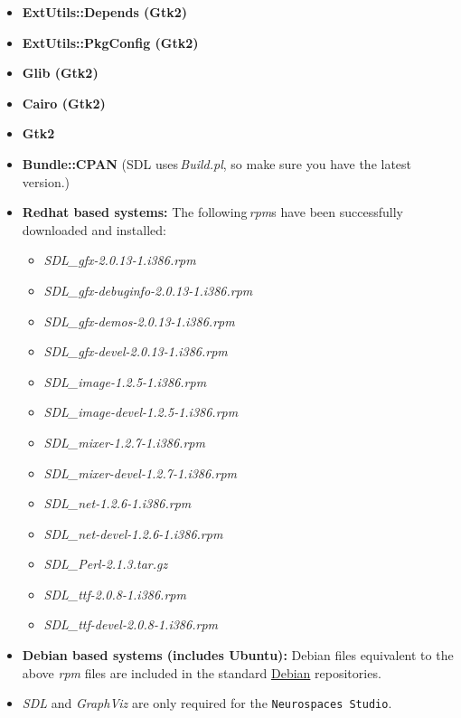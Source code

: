 \documentclass[12pt]{article}
\begin{document}
\begin{enumerate}
\begin{itemize}
\item {\bf ExtUtils::Depends (Gtk2)}
\item {\bf ExtUtils::PkgConfig (Gtk2)}
\item {\bf Glib (Gtk2)}
\item {\bf Cairo (Gtk2)}
\item {\bf Gtk2}
\end{itemize}

\begin{itemize}
\item {\bf Bundle::CPAN} (SDL uses\,{\it Build.pl}, so make sure you have the latest version.) 
\end{itemize}

\begin{itemize}
\item {\bf Redhat based systems:} The following\,{\it rpm}s have been successfully downloaded and installed:

\begin{itemize}
\item {\it SDL\_gfx-2.0.13-1.i386.rpm}
\item {\it SDL\_gfx-debuginfo-2.0.13-1.i386.rpm}
\item {\it SDL\_gfx-demos-2.0.13-1.i386.rpm}
\item {\it SDL\_gfx-devel-2.0.13-1.i386.rpm}
\item {\it SDL\_image-1.2.5-1.i386.rpm}
\item {\it SDL\_image-devel-1.2.5-1.i386.rpm}
\item {\it SDL\_mixer-1.2.7-1.i386.rpm}
\item {\it SDL\_mixer-devel-1.2.7-1.i386.rpm}
\item {\it SDL\_net-1.2.6-1.i386.rpm}
\item {\it SDL\_net-devel-1.2.6-1.i386.rpm}
\item {\it SDL\_Perl-2.1.3.tar.gz}
\item {\it SDL\_ttf-2.0.8-1.i386.rpm}
\item {\it SDL\_ttf-devel-2.0.8-1.i386.rpm}
\end{itemize}

\item {\bf Debian based systems (includes Ubuntu):} Debian files equivalent to the above {\it rpm} files are included in the standard \href{http://www.debian.org/}{Debian} repositories.
\item {\it SDL} and  {\it GraphViz} are only required for the {\tt Neurospaces Studio}.
\end{itemize}
\end{enumerate}
\end{document}
